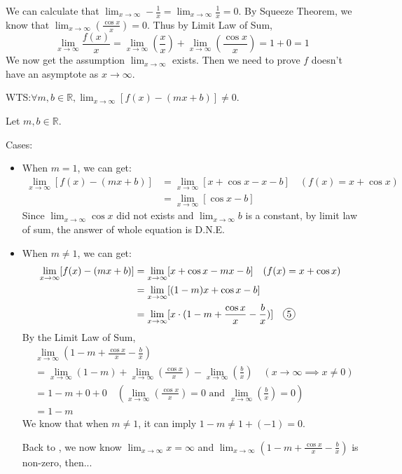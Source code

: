 \documentclass[12pt]{exam}
\newcommand*\circled[1]{\tikz[baseline=(char.base)]{
    \node[shape=circle, draw, inner sep=1pt, 
        minimum height=12pt] (char) {#1};}}
\newcommand{\R}{\mathbb{R}}
\begin{document}
\begin{enumerate}
\begin{enumerate}
		We can calculate that $\lim_{x \to \infty}-\frac{1}{x}=\lim_{x \to \infty}\frac{1}{x}=0$. By Squeeze Theorem, we know that $\lim_{x \to \infty}(\frac{\cos{x}}{x})=0$. Thus by Limit Law of Sum,
		$$
		    \lim_{x \to \infty} \frac{f(x)}{x}=\lim_{x \to \infty}(\frac{x}{x})+\lim_{x \to \infty}(\frac{\cos{x}}{x})=1+0=1
		$$
		We now get the assumption $\lim_{x \to \infty}$ exists. Then we need to prove $f$ doesn't have an asymptote as $x \to \infty$.
		
		WTS:$\forall m,b\in\R,\lim_{x \to \infty}[f(x)-(mx+b)]\neq0.$
		
		Let $m,b\in\R.$
		
		Cases:
		\begin{itemize}
		    \item When $m=1$, we can get:
		    \begin{align*}
		        \lim_{x \to \infty}[f(x)-(mx+b)]&=\lim_{x \to \infty}[x+\cos{x}-x-b]\quad(f(x)=x+\cos{x})\\
		        &=\lim_{x \to \infty}[\cos{x}-b]
		    \end{align*}
		    Since $\lim_{x \to \infty}\cos{x}$ did not exists and $\lim_{x \to \infty}b$ is a constant, by limit law of sum, the answer of whole equation is D.N.E.
		    \item When $m\neq1$, we can get:
		    \begin{align*}
		        \lim_{x \to \infty}[f(x)-(mx+b)]&=\lim_{x \to \infty}[x+\cos{x}-mx-b]\quad(f(x)=x+\cos{x})\\
		        &=\lim_{x \to \infty}[(1-m)x+\cos{x}-b]\\
		        &=\lim_{x \to \infty}[x\cdot(1-m+\frac{\cos{x}}{x}-\frac{b}{x})] \quad\circled{5}
		    \end{align*}
		    By the Limit Law of Sum,
		    \begin{align*}
				&\lim_{x \to \infty}(1-m+\frac{\cos{x}}{x}-\frac{b}{x})\\
				&=\lim_{x \to \infty}(1-m)+\lim_{x \to \infty}(\frac{\cos{x}}{x})-\lim_{x \to \infty}(\frac{b}{x}) \quad (x \to \infty \implies x \neq 0)\\
		        &=1-m+0+0\quad(\lim_{x \to \infty}(\frac{\cos{x}}{x})=0\mbox{ and }\lim_{x \to \infty}(\frac{b}{x})=0)\\
		        &=1-m
		    \end{align*}
		    We know that when $m\neq1$, it can imply $1-m\neq1+(-1)=0$. 
		    
		    Back to \circled{5}, we now know $\lim_{x \to \infty}x=\infty$ and $\lim_{x \to \infty}(1-m+\frac{\cos{x}}{x}-\frac{b}{x})$ is non-zero, then...
		    

\end{itemize}
\end{enumerate}
\end{enumerate}
\end{document}
